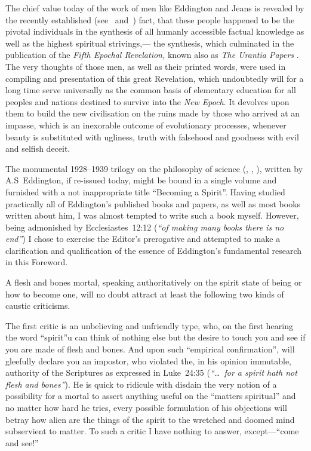\documentclass[12pt]{book}
\begin{document}
The chief value today of the work of men like Eddington and Jeans is revealed by the recently established
(see~\cite{Block1} and~\cite{Aivazian1}) fact, that these people happened to be the pivotal individuals
in the synthesis of all humanly accessible factual knowledge as well as the highest spiritual strivings,---
the synthesis, which culminated in the publication of the \emph{Fifth Epochal Revelation,} known also as
\emph{The Urantia Papers} \cite{Aivazian1}.
The very thoughts of those men, as well as their printed words, were used in compiling and presentation of this
great Revelation, which undoubtedly will for a long time serve universally as the common basis of
elementary education for all peoples and nations destined to survive into the \emph{New Epoch}.
It devolves upon them to build the new civilisation on the ruins made by those who arrived at an impasse,
which is an inexorable outcome of evolutionary processes, whenever beauty is substituted with ugliness,
truth with falsehood and goodness with evil and selfish deceit.

The monumental 1928--1939 trilogy on the philosophy of science (\cite{Eddington1}, \cite{Eddington2}, \cite{Eddington3}),
written by A.S~Eddington, if re-issued today, might be bound in a single volume and furnished with
a not inappropriate title ``Becoming a Spirit''.
Having studied practically all of Eddington's published books and papers, as well as most books written about him,
I was almost tempted to write such a book myself.
However, being admonished by Ecclesiastes~12:12 (\emph{``of making many books there is no end''}) I chose to exercise the
Editor's prerogative and attempted to make a clarification and qualification of the essence of Eddington's
fundamental research in this Foreword.

A flesh and bones mortal, speaking authoritatively on the spirit state of being or how to become one, will no doubt
attract at least the following two kinds of caustic criticisms.

The first critic is an unbelieving and unfriendly type, who, on the first hearing the word ``spirit''u
can think of nothing else but the desire to touch you and see if you are made of flesh and bones.
And upon such ``empirical confirmation'', will gleefully declare you an impostor, who violated the,
in his opinion immutable, authority of the Scriptures as expressed in Luke~24:35 (\emph{``\ldots\ for a spirit hath not flesh and bones''}).
He is quick to ridicule with disdain the very notion of a possibility for a mortal to assert anything useful on the ``matters spiritual''
and no matter how hard he tries, every possible formulation of his objections will betray how alien are the things of the spirit
to the wretched and doomed mind subservient to matter.
To such a critic I have nothing to answer, except---``come and see!''
\end{document}
